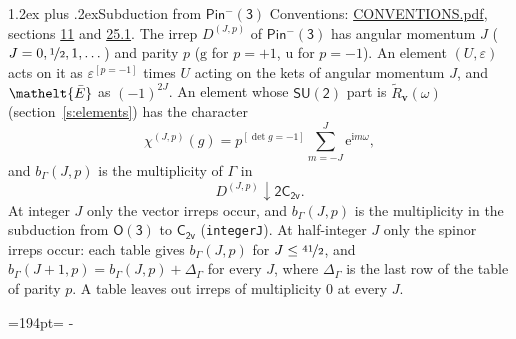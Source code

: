 \documentclass[10pt,a4paper]{article}
\makeatletter
\renewcommand\section{\@startsection{section}{1}{\z@}{-3ex plus -1ex minus -.2ex}%
  {1.2ex plus .2ex}{\normalfont\large\sffamily\bfseries\color{parttitle}}}
\newcommand{\needspace}[1]{\par\penalty-100\begingroup\dimen0=#1\relax\dimen2=\pagegoal
  \advance\dimen2-\pagetotal\ifdim\dimen0>\dimen2\relax\ifdim\dimen2>0pt\vfil\break\fi\fi
  \endgroup}
\numberwithin{equation}{section}
\newcommand{\eltfont}[1]{{\let\sigma\eltsigma\mathelt{#1}}}
\newcommand{\grp}[1]{\mathsf{#1}}
\newcommand{\elt}[1]{\eltfont{#1}}
\newcommand{\ptag}[1]{\mathrm{#1}}
\newcommand{\iverson}[1]{[#1]}
\newcommand{\restr}[2]{#1\!\downarrow#2}
\newcommand{\vv}{\mathbf{v}}
\newcommand{\iunit}{\mathrm{i}}
\newcommand{\expe}{\mathrm{e}}
\newcommand{\irrJp}[2]{D^{(#1,#2)}}
\newcommand{\barred}[1]{\bar{#1}}
\newcommand{\lift}[1]{\tilde{#1}}
\makeatother
\begin{document}
\section{Subduction from \texorpdfstring{$\grp{Pin^{-}(3)}$}{Pin(3)}}\label{s:subduction_parent}
Conventions: \href{../../CONVENTIONS.pdf}{CONVENTIONS.pdf}, sections \href{../../../rotation/CONVENTIONS.pdf\#conv.11}{11} and \href{../../CONVENTIONS.pdf\#conv.25.1}{25.1}.
\leavevmode\label{n:index.J}\label{n:index.parity}\label{n:irrep.o3}The irrep $\irrJp{J}{p}$ of \href{Pinminus3.pdf}{$\grp{Pin^{-}(3)}$} has angular momentum $J$ ($J = 0, \nicefrac{1}{2}, 1, \dots$) and parity $p$ ($\ptag{g}$ for $p = +1$, $\ptag{u}$ for $p = -1$). An element $(U, \varepsilon)$ acts on it as $\varepsilon^{[p = -1]}$ times $U$ acting on the kets of angular momentum $J$, and $\elt{\barred{E}}$ as $(-1)^{2J}$. \label{n:function.character.parent}\label{n:function.multiplicity}An element whose $\grp{SU(2)}$ part is $\lift{R}_{\vv}(\omega)$ (section~\ref{s:elements}) has the character
\begin{equation}\label{e:chi}\chi^{(J,p)}(g) = p^{\iverson{\det g = -1}}\sum_{m=-J}^{J} \expe^{\iunit m\omega},\end{equation}
and $b_\Gamma(J, p)$ is the multiplicity of $\Gamma$ in
\begin{equation}\label{e:parent}\restr{\irrJp{J}{p}}{\grp{2C_{2v}}}.\end{equation}
At integer $J$ only the vector irreps occur, and $b_\Gamma(J, p)$ is the multiplicity in the subduction from $\grp{O(3)}$ to \href{../../../rotation/data/pdf/C2v.pdf}{$\grp{C_{2v}}$} (\texttt{integerJ}). \label{n:index.increment}At half-integer $J$ only the spinor irreps occur: each table gives $b_\Gamma(J, p)$ for $J \le \nicefrac{41}{2}$, and $b_\Gamma(J + 1, p) = b_\Gamma(J, p) + \Delta_\Gamma$ for every $J$, where $\Delta_\Gamma$ is the last row of the table of parity $p$. A table leaves out irreps of multiplicity 0 at every $J$.
\needspace{194pt}
\end{document}
